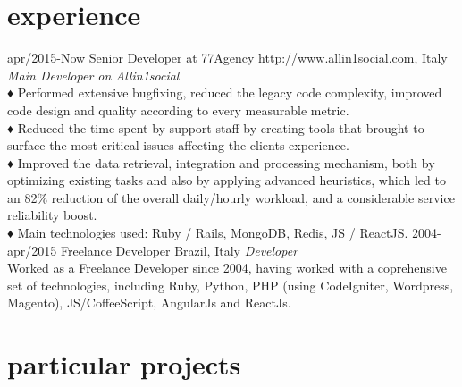\documentclass[]{friggeri-cv} %
\begin{document}

\section{experience}
\begin{entrylist}
\entry
{apr/2015-Now}
{Senior Developer at 77Agency}
{http://www.allin1social.com, Italy}
{\emph{Main Developer on Allin1social} \\
♦ Performed extensive bugfixing, reduced the legacy code complexity, improved 
code design and quality according to every measurable metric. \\
♦ Reduced the time spent by support staff by creating tools that brought to 
surface the most critical issues affecting the clients experience.\\
♦ Improved the data retrieval, integration and processing mechanism, 
both by optimizing existing tasks and also by applying advanced heuristics,
which led to an 82\% reduction of the overall daily/hourly workload, and
a considerable service reliability boost.\\
♦ Main technologies used: Ruby / Rails, MongoDB, Redis, JS / ReactJS.
}
\entry
{2004-apr/2015}
{Freelance Developer}
{Brazil, Italy}
{\emph{Developer} \\ Worked as a Freelance Developer since 2004, having 
worked with a coprehensive set of technologies, including Ruby, Python, PHP (using CodeIgniter, Wordpress, Magento), JS/CoffeeScript, AngularJs and ReactJs.
}
\end{entrylist}


\section{particular projects}
\end{document}
